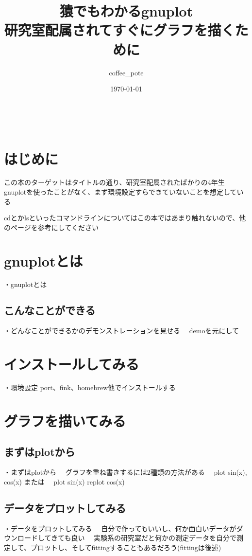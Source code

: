 \documentclass[11pt]{jsarticle}
\title{猿でもわかるgnuplot\\
研究室配属されてすぐにグラフを描くために} %
\author{coffee\_pote}    %
\date{\today}        %
\begin{document}
\maketitle

\tableofcontents　　　　　　%
\newpage


\section{はじめに}
この本のターゲットはタイトルの通り、研究室配属されたばかりの4年生
gnuplotを使ったことがなく、まず環境設定すらできていないことを想定している

cdとかlsといったコマンドラインについてはこの本ではあまり触れないので、他のページを参考にしてください

\section{gnuplotとは}
・gnuplotとは

\subsection{こんなことができる}

・どんなことができるかのデモンストレーションを見せる
　demoを元にして

\section{インストールしてみる}

・環境設定 port、fink、homebrew他でインストールする

\section{グラフを描いてみる}


\subsection{まずはplotから}

・まずはplotから
　グラフを重ね書きするには2種類の方法がある
　plot sin(x), cos(x)
または
　plot sin(x)
 replot cos(x)

\subsection{データをプロットしてみる}
・データをプロットしてみる
　自分で作ってもいいし、何か面白いデータがダウンロードしてきても良い
　実験系の研究室だと何かの測定データを自分で測定して、プロットし、そしてfittingすることもあるだろう(fittingは後述)
\end{document}
